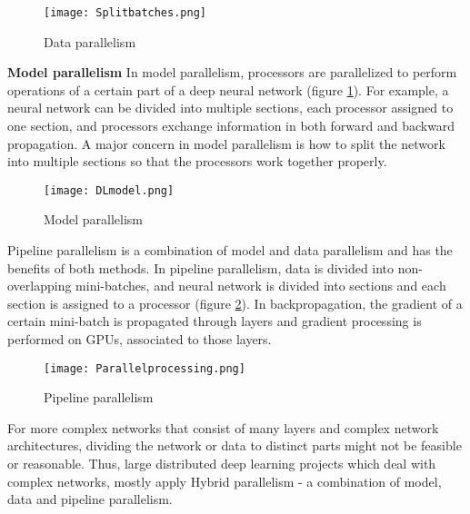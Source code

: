 \begin{figure}[h!]
 \centering
  \texttt{[image: Splitbatches.png]}
    \caption{Data parallelism}

  \label{fig:Data parallelism}
\end{figure}
\textbf{Model parallelism} In model parallelism, processors are parallelized to perform operations of a certain part of a deep neural network (figure \ref{fig:Data parallelism}). For example, a neural network can be divided into multiple sections, each processor assigned to one section, and processors exchange information in both forward and backward propagation. A major concern in model parallelism is how to split the network into multiple sections so that the processors work together properly.



\begin{figure}[h!]
 \centering
  \texttt{[image: DLmodel.png]}
    \caption{Model parallelism}

  \label{fig:pipeline parallelism}
\end{figure}


Pipeline parallelism is a combination of model and data parallelism and has the benefits of both methods. In pipeline parallelism, data is divided into non-overlapping mini-batches, and neural network is divided into sections and each section is assigned to a processor (figure \ref{fig:pipeline parallelism}). In backpropagation, the gradient of a certain mini-batch is propagated through layers and gradient processing is performed on GPUs, associated to those layers.












\begin{figure}[h!]
 \centering
  \texttt{[image: Parallelprocessing.png]}
    \caption{Pipeline parallelism}

  \label{fig:CDS}
\end{figure}

For more complex networks that consist of many layers and complex network architectures, dividing the network or data to distinct parts might not be feasible or reasonable. Thus, large distributed deep learning projects which deal with complex networks, mostly apply Hybrid parallelism - a combination of model, data and pipeline parallelism. 


